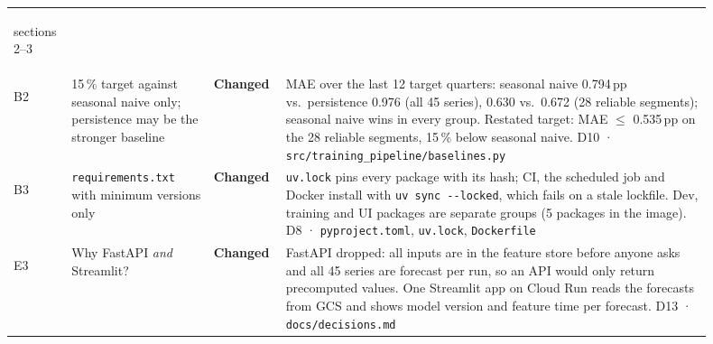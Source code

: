 \documentclass[11pt,a4paper]{article}
\newcommand{\file}[1]{\texttt{#1}}
\newcommand{\changed}{\textbf{\color{statusChanged}Changed}}
\begin{document}
\begin{longtable}{>{\bfseries\raggedright\arraybackslash}p{0.055\linewidth} R{0.19\linewidth} R{0.085\linewidth} R{0.575\linewidth}}
		sections 2--3 \\ \addlinespace[0.3em]
		B2 & 15\,\% target against seasonal naive only; persistence may be the stronger baseline & \changed &
		MAE over the last 12 target quarters: seasonal naive 0.794\,pp vs.\ persistence 0.976 (all 45 series), 0.630 vs.\
		0.672 (28 reliable segments); seasonal naive wins in every group. Restated target: MAE $\le$ 0.535\,pp on the
		28 reliable segments, 15\,\% below seasonal naive. \newline D10 · \file{src/training\_pipeline/baselines.py} \\ \addlinespace[0.3em]
		B3 & \file{requirements.txt} with minimum versions only & \changed &
		\file{uv.lock} pins every package with its hash; CI, the scheduled job and Docker install with \texttt{uv sync
		-{}-locked}, which fails on a stale lockfile. Dev, training and UI packages are separate groups (5 packages in the image). \newline D8 · \file{pyproject.toml}, \file{uv.lock}, \file{Dockerfile} \\ \addlinespace[0.3em]
		E3 & Why FastAPI \emph{and} Streamlit? & \changed &
		FastAPI dropped: all inputs are in the feature store before anyone asks and all 45 series are forecast per run, so an
		API would only return precomputed values. One Streamlit app on Cloud Run reads the forecasts from GCS and shows
		model version and feature time per forecast. \newline D13 · \file{docs/decisions.md} \\
		\bottomrule
	\end{longtable}
	\endgroup
	
	\vfill
	
\end{document}
